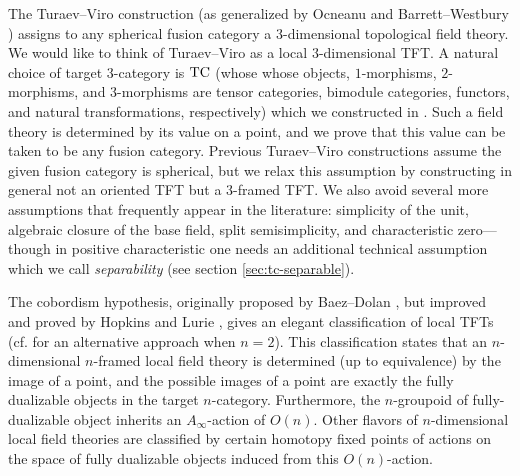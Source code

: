 \documentclass{amsart}
\begin{document}
The Turaev--Viro \cite{MR1191386, MR1292673} construction (as generalized by Ocneanu \cite{MR1317353} and Barrett--Westbury \cite{MR1686423}) assigns to any spherical fusion category a 3-dimensional topological field theory.   We would like to think of Turaev--Viro as a local $3$-dimensional TFT.  A natural choice of target $3$-category is $\mathrm{TC}$ (whose whose objects, $1$-morphisms, $2$-morphisms, and $3$-morphisms are tensor categories, bimodule categories, functors, and natural transformations, respectively) which we constructed in \cite{3TC}.  Such a field theory is determined by its value on a point, and we prove that this value can be taken to be any fusion category.  Previous Turaev--Viro constructions assume the given fusion category is spherical, but we relax this assumption by constructing in general not an oriented TFT but a $3$-framed TFT. %
We also avoid several more assumptions that frequently appear in the literature: simplicity of the unit, algebraic closure of the base field, split semisimplicity, and characteristic zero---though in positive characteristic one needs an additional technical assumption which we call {\em separability} (see section \ref{sec:tc-separable}).

The cobordism hypothesis, originally proposed by Baez--Dolan \cite{MR1355899}, but improved and proved by Hopkins and Lurie \cite{lurie-ch}, gives an elegant classification of local TFTs (cf. \cite{schommer-pries-thesis} for an alternative approach when $n=2$).  This classification states that an $n$-dimensional $n$-framed local field theory is determined (up to equivalence) by the image of a point, and the possible images of a point are exactly the fully dualizable objects in the target $n$-category.  Furthermore, the $n$-groupoid of fully-dualizable object inherits an $A_\infty$-action of $O(n)$. Other flavors of $n$-dimensional local field theories are classified by certain homotopy fixed points of actions %
on the space of fully dualizable objects induced from this $O(n)$-action. 
\end{document}
